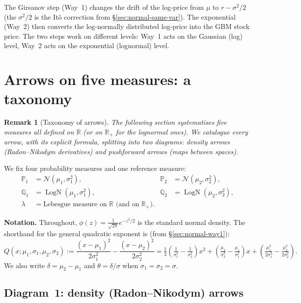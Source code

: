 \documentclass[11pt,a4paper]{article}
\newtheorem{remark}{Remark}
\newcommand{\N}{\mathcal{N}}
\newcommand{\LN}{\operatorname{LogN}}
\newcommand{\R}{\mathbb{R}}
\newcommand{\Rp}{\mathbb{R}_{+}}
\begin{document}
\noindent
The Girsanov step (Way~1) changes the drift of the log-price from $\mu$ to $r-\sigma^2/2$
(the $\sigma^2/2$ is the It\^o correction from \S\ref{sec:normal-same-var}).
The exponential (Way~2) then converts the log-normally distributed log-price into the GBM
stock price.  The two steps work on different levels: Way~1 acts on the Gaussian (log) level,
Way~2 acts on the exponential (lognormal) level.

\section{Arrows on five measures: a taxonomy}
\label{sec:arrows}

\begin{remark}[Taxonomy of arrows]
The following section systematises five measures all defined
on $\R$ (or on $\Rp$ for the lognormal ones).  We catalogue every arrow, with its explicit
formula, splitting into two diagrams: density arrows (Radon--Nikodym derivatives) and
pushforward arrows (maps between spaces).
\end{remark}

\noindent We fix four probability measures and one reference measure:
\begin{align*}
  \mathbb{P}_1 &= \N(\mu_1,\sigma_1^2), &
  \mathbb{P}_2 &= \N(\mu_2,\sigma_2^2), \\
  \mathbb{Q}_1 &= \LN(\mu_1,\sigma_1^2), &
  \mathbb{Q}_2 &= \LN(\mu_2,\sigma_2^2), \\
  \lambda      &= \text{Lebesgue measure on }\R\text{ (and on }\Rp\text{).}
\end{align*}

\medskip\noindent\textbf{Notation.}
Throughout, $\phi(z)=\frac{1}{\sqrt{2\pi}}e^{-z^2/2}$ is the standard normal density.
The shorthand for the general quadratic exponent is (from \S\ref{sec:normal-way1}):
\[
  Q(x;\mu_1,\sigma_1,\mu_2,\sigma_2)
  :=\frac{(x-\mu_1)^2}{2\sigma_1^2}-\frac{(x-\mu_2)^2}{2\sigma_2^2}
  = \tfrac{1}{2}\!\left(\tfrac{1}{\sigma_1^2}-\tfrac{1}{\sigma_2^2}\right)x^2
    +\left(\tfrac{\mu_2}{\sigma_2^2}-\tfrac{\mu_1}{\sigma_1^2}\right)x
    +\left(\tfrac{\mu_1^2}{2\sigma_1^2}-\tfrac{\mu_2^2}{2\sigma_2^2}\right).
\]
We also write $\delta=\mu_2-\mu_1$ and $\theta=\delta/\sigma$ when $\sigma_1=\sigma_2=\sigma$.

\subsection{Diagram~1: density (Radon--Nikodym) arrows}
\label{sec:diag1}
\end{document}
